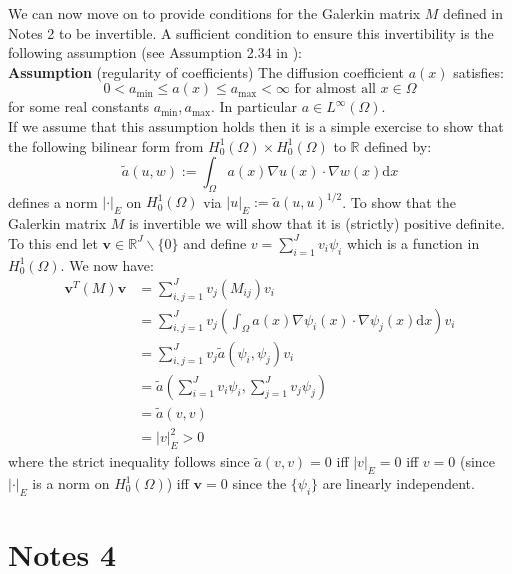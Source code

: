 \documentclass{article}
\theoremstyle{definition}
\theoremstyle{remark}
\begin{document}
We can now move on to provide conditions for the Galerkin matrix $M$ defined in Notes 2 to be invertible. A sufficient condition to ensure this invertibility is the following assumption (see Assumption 2.34 in \cite{lord2014introduction}): \\

\noindent \textbf{Assumption} (regularity of coefficients) The diffusion coefficient $a(x)$ satisfies:
\begin{equation}
    \label{regularity_of_coeff}
    0<a_{\text{min}}\leq a(x) \leq a_{\text{max}}<\infty \text{ for almost all } x\in\Omega
\end{equation}
for some real constants $a_{\text{min}},a_{\text{max}}$. In particular $a\in L^{\infty}(\Omega)$. \\

If we assume that this assumption holds then it is a simple exercise to show that the following bilinear form from $H_{0}^{1}(\Omega)\times H_{0}^{1}(\Omega)$ to $\mathbb{R}$ defined by:
\begin{equation}
    \label{bilinear_form}
    \tilde{a}(u,w):=\int_{\Omega}a(x)\nabla u(x)\cdot\nabla w(x)\mathrm{d}x
\end{equation}
defines a norm $|\cdot|_{E}$ on $H_{0}^{1}(\Omega)$ via $|u|_{E}:=\tilde{a}(u,u)^{1/2}$. To show that the Galerkin matrix $M$ is invertible we will show that it is (strictly) positive definite. To this end let $\mathbf{v}\in\mathbb{R}^{J}\backslash\{0\}$ and define $v=\sum_{i=1}^{J}v_{i}\psi_{i}$ which is a function in $H_{0}^{1}(\Omega)$. We now have:
\begin{align*}
    \mathbf{v}^{T}(M)\mathbf{v}&=\sum_{i,j=1}^{J}v_{j}(M_{ij})v_{i} \\
    &=\sum_{i,j=1}^{J}v_{j}\left(\int_{\Omega}a(x)\nabla\psi_{i}(x)\cdot\nabla\psi_{j}(x)\mathrm{d}x\right)v_{i} \\
    &=\sum_{i,j=1}^{J}v_{j}\tilde{a}(\psi_{i},\psi_{j})v_{i}\\
    &=\tilde{a}\left(\sum_{i=1}^{J}v_{i}\psi_{i},\sum_{j=1}^{J}v_{j}\psi_{j}\right) \\
    &=\tilde{a}(v,v) \\
    &=|v|_{E}^{2}>0
\end{align*}
where the strict inequality follows since $\tilde{a}(v,v)=0$ iff $|v|_{E}=0$ iff $v=0$ (since $|\cdot|_{E}$ is a norm on $H_{0}^{1}(\Omega)$) iff $\mathbf{v}=0$ since the $\{\psi_{i}\}$ are linearly independent.

\section{Notes 4}
\end{document}
